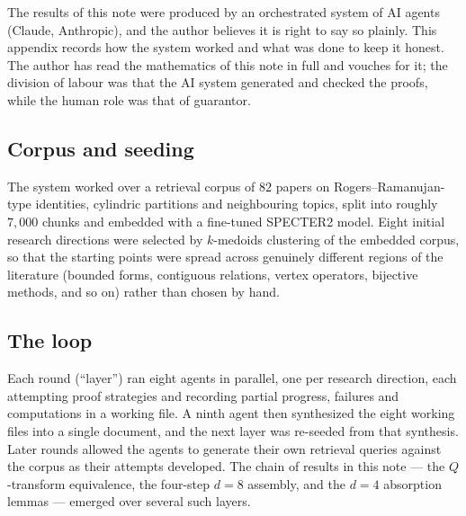 \documentclass[11pt]{article}
\begin{document}
The results of this note were produced by an orchestrated system of AI
agents (Claude, Anthropic), and the author believes it is right to say so
plainly. This appendix records how the system worked and what was done to
keep it honest. The author has read the mathematics of this note in full
and vouches for it; the division of labour was that the AI system
generated and checked the proofs, while the human role was that of
guarantor.

\subsection*{Corpus and seeding}
The system worked over a retrieval corpus of $82$ papers on
Rogers--Ramanujan-type identities, cylindric partitions and
neighbouring topics, split into roughly $7{,}000$ chunks and embedded with a fine-tuned SPECTER2
model. Eight initial research directions were selected by $k$-medoids
clustering of the embedded corpus, so that the starting points were
spread across genuinely different regions of the literature (bounded
forms, contiguous relations, vertex operators, bijective methods, and so
on) rather than chosen by hand.

\subsection*{The loop}
Each round (``layer'') ran eight agents in parallel, one per research
direction, each attempting proof strategies and recording partial
progress, failures and computations in a working file. A ninth agent then
synthesized the eight working files into a single document, and the next
layer was re-seeded from that synthesis. Later rounds allowed the agents
to generate their own retrieval queries against the corpus as their
attempts developed. The chain of results in this note --- the
$Q$-transform equivalence, the four-step $d=8$ assembly, and the $d=4$
absorption lemmas --- emerged over several such layers.
\end{document}
